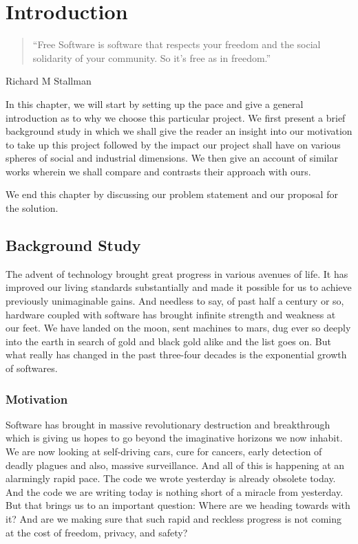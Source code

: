 \chapter{Introduction}
\begin{quotation}
    “Free Software is software that respects your freedom and the social solidarity of your community. So it’s free as in freedom.”
\end{quotation}

\begin{flushright}
    Richard M Stallman
\end{flushright}


In this chapter, we will start by setting up the pace and give a general introduction as to why we choose this particular project. We first present a brief background study in which we shall give the reader an insight into our motivation to take up this project followed by the impact our project shall have on various spheres of social and industrial dimensions. We then give an account of similar works wherein we shall compare and contrasts their approach with ours.

We end this chapter by discussing our problem statement and our proposal for the solution.

\section{Background Study}
The advent of technology brought great progress in various avenues of life. It has improved our living standards substantially and made it possible for us to achieve previously unimaginable gains. And needless to say, of past half a century or so, hardware coupled with software has brought infinite strength and weakness at our feet. We have landed on the moon, sent machines to mars, dug ever so deeply into the earth in search of gold and black gold alike and the list goes on. But what really has changed in the past three-four decades is the exponential growth of softwares.

\subsection{Motivation}
Software has brought in massive revolutionary destruction and breakthrough which is giving us hopes to go beyond the imaginative horizons we now inhabit. We are now looking at self-driving cars, cure for cancers, early detection of deadly plagues and also, massive surveillance. And all of this is happening at an alarmingly rapid pace. The code we wrote yesterday is already obsolete today. And the code we are writing today is nothing short of a miracle from yesterday. But that brings us to an important question: Where are we heading towards with it? And are we making sure that such rapid and reckless progress is not coming at the cost of freedom, privacy, and safety?

